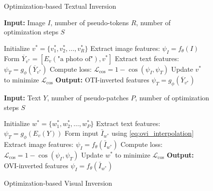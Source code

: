 \algrenewcommand{}
\begin{figure}[t]
    \captionsetup{labelformat=empty}
    \addtocounter{figure}{-1}

    \centering
    \begin{minipage}[t]{0.47\textwidth}
        \begin{algorithm}[H]
            \captionsetup{font=scriptsize}
            \scriptsize
            \caption{Optimization-based Textual Inversion }
            \label{alg:oti}
            \begin{algorithmic}[1]
                \State \textbf{Input:} Image $I$, number of pseudo-tokens $R$, number of optimization steps $S$
              
                \State Initialize $v^* = \{v_1^*, v_2^*, \ldots, v_R^*\}$
                \State Extract image features: $\psi_I = f_{\theta}(I)$
                  \State Form $\overline{Y}_{v^*} = [E_v(\text{"a photo of"}), v^*]$
                    \State Extract text features: $\psi_T = g_{\phi}(\overline{Y}_{v^*})$
                    \State Compute loss: $\mathcal{L}_{\text{cos}} = 1 - \cos{(\psi_I, \psi_T)}$
                    \State Update $v^*$ to minimize $\mathcal{L}_{\text{cos}}$
                \EndFor
                \State \textbf{Output:} OTI-inverted features $\psi_T = g_{\phi}(\overline{Y}_{v^*})$
            \end{algorithmic}
        \end{algorithm}
    \end{minipage}
    \hfill
    \begin{minipage}[t]{0.50\textwidth}
        \begin{algorithm}[H]
            \scriptsize
            \captionsetup{font=scriptsize}
            \caption{Optimization-based Visual Inversion }
            \label{alg:ovi}
            \begin{algorithmic}[1]
                \State \textbf{Input:} Text $Y$, number of pseudo-patches $P$, number of optimization steps $S$
                
                \State Initialize $w^* = \{w_1^*, w_2^*, \ldots, w_P^*\}$
                \State Extract text features: $\psi_T = g_{\phi}(E_v(Y))$
                    \State Form input $\bar{I}_{w^*}$ using \cref{eq:ovi_interpolation}
                    \State Extract image features: $\psi_I = f_{\theta}(\bar{I}_{w^*})$
                    \State Compute loss: $\mathcal{L}_{\text{cos}} = 1 - \cos{(\psi_I, \psi_T)}$
                    \State Update $w^*$ to minimize $\mathcal{L}_{\text{cos}}$
                \EndFor
                \State \textbf{Output:} OVI-inverted features $\psi_I = f_{\theta}(\bar{I}_{w^*})$
            \end{algorithmic}
        \end{algorithm}
    \end{minipage}
    

\end{figure}

